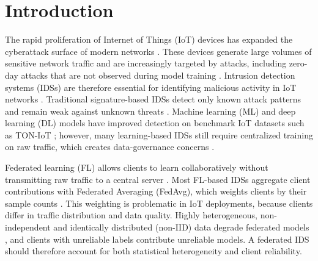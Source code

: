 \documentclass[pdflatex,sn-mathphys-num]{sn-jnl}
\begin{document}
\begin{abstract}
{complete predictor adds about 16\,ms per 1,000 flows to inference. Code, per-seed results and the table generator are publicly released.}
\end{abstract}


\section{Introduction}
\label{sec:introduction}
The rapid proliferation of Internet of Things (IoT) devices has expanded the cyberattack surface of modern networks \cite{hamad2025systematic,sharma2025leveraging,rahman2025survey,alshdadi2025federated}. These devices generate large volumes of sensitive network traffic \cite{malatji2025artificial,alketbi2025comprehensive} and are increasingly targeted by attacks, including zero-day attacks that are not observed during model training \cite{kim2020ai}. Intrusion detection systems (IDSs) are therefore essential for identifying malicious activity in IoT networks \cite{alsbatin2025enhancing,rahman2020internet}. Traditional signature-based IDSs detect only known attack patterns and remain weak against unknown threats \cite{kim2020ai,alsbatin2025enhancing,rahman2020internet,amrullah2025review,menon2025ai}. Machine learning (ML) and deep learning (DL) models have improved detection on benchmark IoT datasets such as TON-IoT \cite{sharma2025leveraging,alshdadi2025federated,alsbatin2025enhancing,menon2025ai,mohale2025systematic,mallidi2025advancements,hozouri2025comprehensive}; however, many learning-based IDSs still require centralized training on raw traffic, which creates data-governance concerns \cite{hamad2025systematic,alshdadi2025federated}.

Federated learning (FL) allows clients to learn collaboratively without transmitting raw traffic to a central server \cite{rahman2020internet,menon2025ai,al2025privacy,li2020deepfed,ismail2025intrusion}. Most FL-based IDSs aggregate client contributions with Federated Averaging (FedAvg), which weights clients by their sample counts \cite{alshdadi2025federated,menon2025ai,hozouri2025comprehensive}. This weighting is problematic in IoT deployments, because clients differ in traffic distribution and data quality. Highly heterogeneous, non-independent and identically distributed (non-IID) data degrade federated models \cite{zhao2018federated,li2020fedprox,karimireddy2020scaffold}, and clients with unreliable labels contribute unreliable models. A federated IDS should therefore account for both statistical heterogeneity and client reliability.
\end{document}
